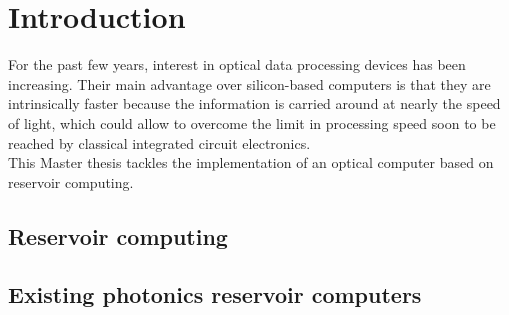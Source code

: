 \chapter{Introduction}
\label{introduction}

For the past few years, interest in optical data processing devices has been increasing. Their main advantage over silicon-based computers is that they are intrinsically faster because the information is carried around at nearly the speed of light, which could allow to overcome the limit in processing speed soon to be reached by classical integrated circuit electronics.\\

This Master thesis tackles the implementation of an optical computer based on reservoir computing.

\section{Reservoir computing}

\section{Existing photonics reservoir computers}